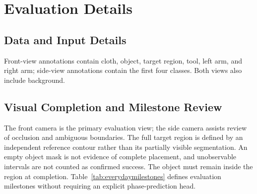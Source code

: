 \section{Evaluation Details}
\label{app:evaluationdetails}

\subsection{Data and Input Details}
Front-view annotations contain cloth, object, target region, tool, left arm, and right arm; side-view annotations contain the first four classes.
Both views also include background.

\subsection{Visual Completion and Milestone Review}
The front camera is the primary evaluation view; the side camera assists review of occlusion and ambiguous boundaries.
The full target region is defined by an independent reference contour rather than its partially visible segmentation.
An empty object mask is not evidence of complete placement, and unobservable intervals are not counted as confirmed success.
The object must remain inside the region at completion.
Table~\ref{tab:everydaymilestones} defines evaluation milestones without requiring an explicit phase-prediction head.

